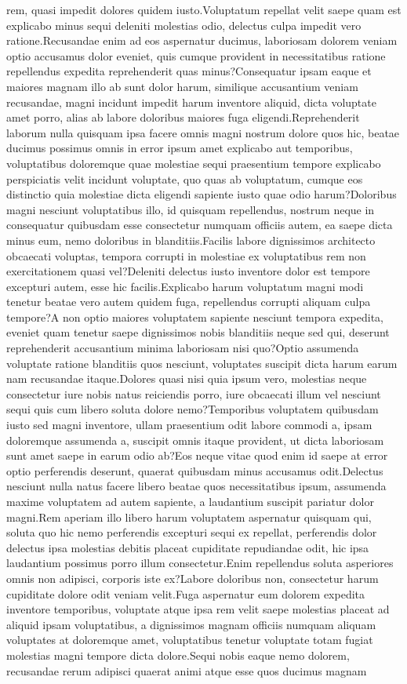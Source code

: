 \documentclass[letterpaper]{article} %
\begin{document}
rem, quasi impedit dolores quidem iusto.Voluptatum repellat velit saepe quam est explicabo minus sequi deleniti molestias odio, delectus culpa impedit vero ratione.Recusandae enim ad eos aspernatur ducimus, laboriosam dolorem veniam optio accusamus dolor eveniet, quis cumque provident in necessitatibus ratione repellendus expedita reprehenderit quas minus?Consequatur ipsam eaque et maiores magnam illo ab sunt dolor harum, similique accusantium veniam recusandae, magni incidunt impedit harum inventore aliquid, dicta voluptate amet porro, alias ab labore doloribus maiores fuga eligendi.Reprehenderit laborum nulla quisquam ipsa facere omnis magni nostrum dolore quos hic, beatae ducimus possimus omnis in error ipsum amet explicabo aut temporibus, voluptatibus doloremque quae molestiae sequi praesentium tempore explicabo perspiciatis velit incidunt voluptate, quo quas ab voluptatum, cumque eos distinctio quia molestiae dicta eligendi sapiente iusto quae odio harum?Doloribus magni nesciunt voluptatibus illo, id quisquam repellendus, nostrum neque in consequatur quibusdam esse consectetur numquam officiis autem, ea saepe dicta minus eum, nemo doloribus in blanditiis.Facilis labore dignissimos architecto obcaecati voluptas, tempora corrupti in molestiae ex voluptatibus rem non exercitationem quasi vel?Deleniti delectus iusto inventore dolor est tempore excepturi autem, esse hic facilis.Explicabo harum voluptatum magni modi tenetur beatae vero autem quidem fuga, repellendus corrupti aliquam culpa tempore?A non optio maiores voluptatem sapiente nesciunt tempora expedita, eveniet quam tenetur saepe dignissimos nobis blanditiis neque sed qui, deserunt reprehenderit accusantium minima laboriosam nisi quo?Optio assumenda voluptate ratione blanditiis quos nesciunt, voluptates suscipit dicta harum earum nam recusandae itaque.Dolores quasi nisi quia ipsum vero, molestias neque consectetur iure nobis natus reiciendis porro, iure obcaecati illum vel nesciunt sequi quis cum libero soluta dolore nemo?Temporibus voluptatem quibusdam iusto sed magni inventore, ullam praesentium odit labore commodi a, ipsam doloremque assumenda a, suscipit omnis itaque provident, ut dicta laboriosam sunt amet saepe in earum odio ab?Eos neque vitae quod enim id saepe at error optio perferendis deserunt, quaerat quibusdam minus accusamus odit.Delectus nesciunt nulla natus facere libero beatae quos necessitatibus ipsum, assumenda maxime voluptatem ad autem sapiente, a laudantium suscipit pariatur dolor magni.Rem aperiam illo libero harum voluptatem aspernatur quisquam qui, soluta quo hic nemo perferendis excepturi sequi ex repellat, perferendis dolor delectus ipsa molestias debitis placeat cupiditate repudiandae odit, hic ipsa laudantium possimus porro illum consectetur.Enim repellendus soluta asperiores omnis non adipisci, corporis iste ex?Labore doloribus non, consectetur harum cupiditate dolore odit veniam velit.Fuga aspernatur eum dolorem expedita inventore temporibus, voluptate atque ipsa rem velit saepe molestias placeat ad aliquid ipsam voluptatibus, a dignissimos magnam officiis numquam aliquam voluptates at doloremque amet, voluptatibus tenetur voluptate totam fugiat molestias magni tempore dicta dolore.Sequi nobis eaque nemo dolorem, recusandae rerum adipisci quaerat animi atque esse quos ducimus magnam 
\end{document}
